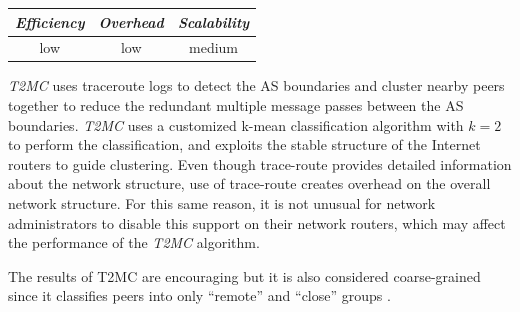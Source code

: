 \begin{center}
\begin{tabular}{ccc}
\emph{Efficiency} & \emph{Overhead} & \emph{Scalability} \\
\hline
low &
low &
medium
\end{tabular}
\end{center}

\emph{T2MC} \cite{SLCGZ2008} uses traceroute logs to detect the AS boundaries and
cluster nearby peers together to reduce the redundant multiple message
passes between the AS boundaries. \emph{T2MC} uses a customized k-mean classification
algorithm with $k = 2$ to perform the classification, and exploits the stable
structure of the Internet routers to guide clustering. Even though trace-route
provides detailed information about the network structure, use of trace-route
creates overhead on the overall network structure. For this same reason, it is
not unusual for network administrators to disable this support on their network
routers, which may affect the performance of the \emph{T2MC} algorithm.

The results of T2MC are encouraging but it is also considered coarse-grained
since it classifies peers into only ``remote'' and ``close''
groups \cite{QLZG2009}.


